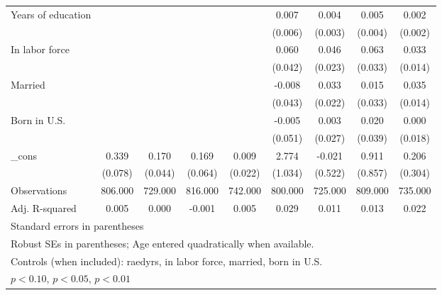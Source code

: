 \begin{table}[htbp]
\begin{tabular}{l*{8}{c}}
Years of education&                  &                  &                  &                  &    0.007         &    0.004         &    0.005         &    0.002         \\
          &                  &                  &                  &                  &  (0.006)         &  (0.003)         &  (0.004)         &  (0.002)         \\
In labor force&                  &                  &                  &                  &    0.060         &    0.046\sym{**} &    0.063\sym{*}  &    0.033\sym{**} \\
          &                  &                  &                  &                  &  (0.042)         &  (0.023)         &  (0.033)         &  (0.014)         \\
Married   &                  &                  &                  &                  &   -0.008         &    0.033         &    0.015         &    0.035\sym{***}\\
          &                  &                  &                  &                  &  (0.043)         &  (0.022)         &  (0.033)         &  (0.014)         \\
Born in U.S.&                  &                  &                  &                  &   -0.005         &    0.003         &    0.020         &    0.000         \\
          &                  &                  &                  &                  &  (0.051)         &  (0.027)         &  (0.039)         &  (0.018)         \\
\_cons    &    0.339\sym{***}&    0.170\sym{***}&    0.169\sym{***}&    0.009         &    2.774\sym{***}&   -0.021         &    0.911         &    0.206         \\
          &  (0.078)         &  (0.044)         &  (0.064)         &  (0.022)         &  (1.034)         &  (0.522)         &  (0.857)         &  (0.304)         \\
\midrule
Observations&  806.000         &  729.000         &  816.000         &  742.000         &  800.000         &  725.000         &  809.000         &  735.000         \\
Adj. R-squared&    0.005         &    0.000         &   -0.001         &    0.005         &    0.029         &    0.011         &    0.013         &    0.022         \\
\bottomrule
\multicolumn{9}{l}{\footnotesize Standard errors in parentheses}\\
\multicolumn{9}{l}{\footnotesize Robust SEs in parentheses; Age entered quadratically when available.}\\
\multicolumn{9}{l}{\footnotesize Controls (when included): raedyrs, in labor force, married, born in U.S.}\\
\multicolumn{9}{l}{\footnotesize \sym{*} \(p<0.10\), \sym{**} \(p<0.05\), \sym{***} \(p<0.01\)}\\
\end{tabular}
\end{table}
